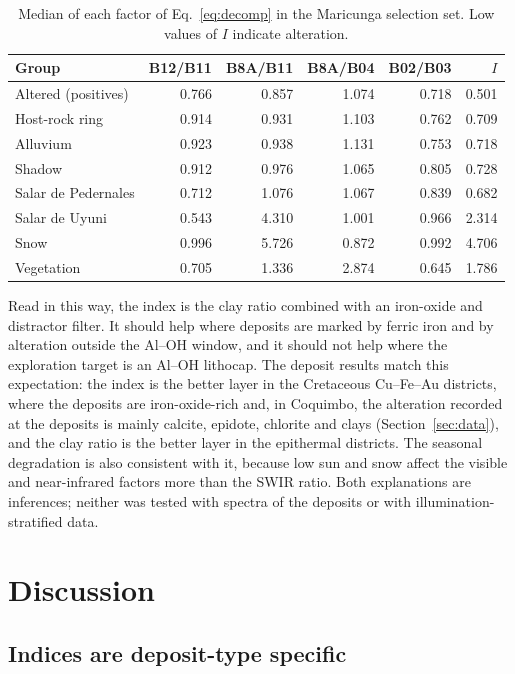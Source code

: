 \documentclass[pdflatex,sn-basic]{sn-jnl}
\begin{document}
\begin{table}[ht]
\centering
\caption{Median of each factor of Eq.~\ref{eq:decomp} in the Maricunga selection set. Low values of $I$ indicate alteration.}
\label{tab:terms}
\small
\begin{tabular}{lrrrrr}
\toprule
Group & B12/B11 & B8A/B11 & B8A/B04 & B02/B03 & $I$ \\
\midrule
Altered (positives) & 0.766 & 0.857 & 1.074 & 0.718 & 0.501 \\
Host-rock ring & 0.914 & 0.931 & 1.103 & 0.762 & 0.709 \\
Alluvium & 0.923 & 0.938 & 1.131 & 0.753 & 0.718 \\
Shadow & 0.912 & 0.976 & 1.065 & 0.805 & 0.728 \\
Salar de Pedernales & 0.712 & 1.076 & 1.067 & 0.839 & 0.682 \\
Salar de Uyuni & 0.543 & 4.310 & 1.001 & 0.966 & 2.314 \\
Snow & 0.996 & 5.726 & 0.872 & 0.992 & 4.706 \\
Vegetation & 0.705 & 1.336 & 2.874 & 0.645 & 1.786 \\
\bottomrule
\end{tabular}
\end{table}

Read in this way, the index is the clay ratio combined with an iron-oxide and distractor filter. It should help where deposits are marked by ferric iron and by alteration outside the Al--OH window, and it should not help where the exploration target is an Al--OH lithocap. The deposit results match this expectation: the index is the better layer in the Cretaceous Cu--Fe--Au districts, where the deposits are iron-oxide-rich \citep{Sillitoe2003} and, in Coquimbo, the alteration recorded at the deposits is mainly calcite, epidote, chlorite and clays (Section~\ref{sec:data}), and the clay ratio is the better layer in the epithermal districts. The seasonal degradation is also consistent with it, because low sun and snow affect the visible and near-infrared factors more than the SWIR ratio. Both explanations are inferences; neither was tested with spectra of the deposits or with illumination-stratified data.

\section{Discussion}
\label{sec:discussion}

\subsection{Indices are deposit-type specific}
\end{document}
